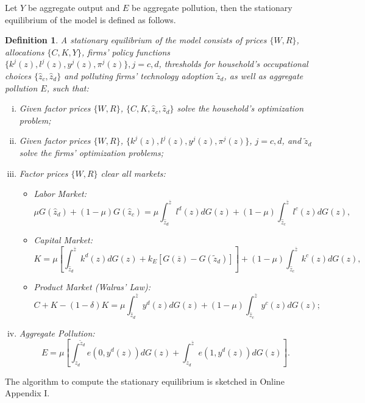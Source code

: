\documentclass[AEJ]{AEA}
\newtheorem{definition}{Definition}
\begin{document}
Let $Y$ be aggregate output and $E$ be aggregate pollution, then the stationary equilibrium of the model is defined as follows.
\begin{definition}
\label{def:ge}
A stationary equilibrium of the model consists of prices $\{W, R \}$, allocations $\{C, K, Y \}$, firms' policy functions $\{k^j(z),l^j(z),y^j(z),\pi^j(z)\}, j = c,d$, thresholds for household's occupational choices $\{\hat{z}_c, \hat{z}_d\}$ and polluting firms' technology adoption $\tilde{z}_d$, as well as aggregate pollution $E$, such that:
\begin{enumerate}[(i)]
    \item
    Given factor prices $\{W, R\}$, $\{C, K, \hat{z}_c, \hat{z}_d\}$ solve the household's optimization problem;
    \item
    Given factor prices $\{W, R\}$, $\{k^j(z),l^j(z),y^j(z),\pi^j(z)\}$, $j = c,d$, and $\tilde{z}_d$ solve the firms' optimization problems;
    \item
    Factor prices $\{W, R\}$ clear all markets:
    \begin{itemize}
        \item
        Labor Market:
        \begin{equation*}
            \mu G(\hat{z}_d) + (1-\mu) G(\hat{z}_c) = \mu \int_{\hat{z}_d}^{\overline{z}} l^d(z)dG(z) + (1-\mu)\int_{\hat{z}_c}^{\overline{z}} l^c(z)dG(z),
        \end{equation*}
        \item
        Capital Market:
        \begin{equation*}
            K = \mu \left[\int_{\hat{z}_d}^{\overline{z}} k^d(z)dG(z) + k_E [G(\overline{z})-G(\tilde{z}_d)]\right] + (1-\mu)\int_{\hat{z}_c}^{\overline{z}} k^c(z)dG(z),
        \end{equation*}
        \item
        Product Market (Walras' Law):
        \begin{equation*}
            C + K - (1-\delta)K = \mu \int_{\hat{z}_d}^{\overline{z}} y^d(z)dG(z) + (1-\mu)\int_{\hat{z}_c}^{\overline{z}} y^c(z)dG(z);
        \end{equation*}
    \end{itemize}
    \item
    Aggregate Pollution:
    \begin{equation*}
        E = \mu\left[\int_{\hat{z}_d}^{\tilde{z}_d} e\left(0,y^d(z)\right)dG(z) + \int_{\tilde{z}_d}^{\overline{z}} e\left(1,y^d(z)\right) dG(z)\right].
    \end{equation*}
\end{enumerate}
\end{definition}
\noindent The algorithm to compute the stationary equilibrium is sketched in Online Appendix I.
\end{document}
